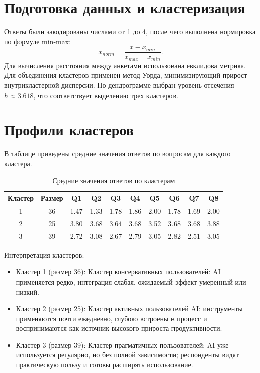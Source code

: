 \documentclass[12pt]{article}
\begin{document}
\section*{Подготовка данных и кластеризация}
Ответы были закодированы числами от 1 до 4, после чего выполнена нормировка по формуле min-max:
\[
x_{norm} = \frac{x - x_{min}}{x_{max} - x_{min}}.
\]
Для вычисления расстояния между анкетами использована евклидова метрика. Для объединения кластеров применен метод Уорда, минимизирующий прирост внутрикластерной дисперсии. По дендрограмме выбран уровень отсечения $h \approx 3.618$, что соответствует выделению трех кластеров.

\section*{Профили кластеров}
В таблице приведены средние значения ответов по вопросам для каждого кластера.

\begin{table}[H]
\centering
\small
\begin{tabular}{|c|c|c|c|c|c|c|c|c|c|}
\hline
Кластер & Размер & Q1 & Q2 & Q3 & Q4 & Q5 & Q6 & Q7 & Q8 \\ \hline
1 & 36 & 1.47 & 1.33 & 1.78 & 1.86 & 2.00 & 1.78 & 1.69 & 2.00 \\ \hline
2 & 25 & 3.80 & 3.68 & 3.64 & 3.68 & 3.52 & 3.68 & 3.68 & 3.88 \\ \hline
3 & 39 & 2.72 & 3.08 & 2.67 & 2.79 & 3.05 & 2.82 & 2.51 & 3.05 \\ \hline
\end{tabular}
\caption{Средние значения ответов по кластерам}
\end{table}

\noindent Интерпретация кластеров:
\begin{itemize}
\item Кластер 1 (размер 36): Кластер консервативных пользователей: AI применяется редко, интеграция слабая, ожидаемый эффект умеренный или низкий.
\item Кластер 2 (размер 25): Кластер активных пользователей AI: инструменты применяются почти ежедневно, глубоко встроены в процесс и воспринимаются как источник высокого прироста продуктивности.
\item Кластер 3 (размер 39): Кластер прагматичных пользователей: AI уже используется регулярно, но без полной зависимости; респонденты видят практическую пользу и готовы расширять использование.
\end{itemize}
\end{document}

